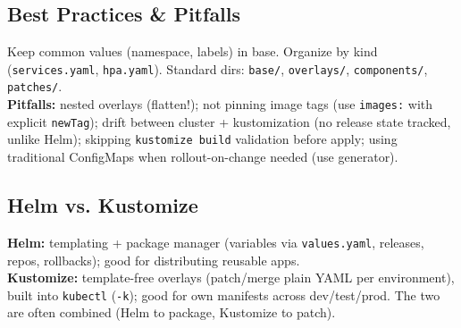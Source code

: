 \subsection{Best Practices \& Pitfalls}
Keep common values (namespace, labels) in base. Organize by kind (\texttt{services.yaml}, \texttt{hpa.yaml}). Standard dirs: \texttt{base/}, \texttt{overlays/}, \texttt{components/}, \texttt{patches/}.\\
\textbf{Pitfalls:} nested overlays (flatten!); not pinning image tags (use \texttt{images:} with explicit \texttt{newTag}); drift between cluster + kustomization (no release state tracked, unlike Helm); skipping \texttt{kustomize build} validation before apply; using traditional ConfigMaps when rollout-on-change needed (use generator).

\subsection{Helm vs. Kustomize}
\textbf{Helm:} templating + package manager (variables via \texttt{values.yaml}, releases, repos, rollbacks); good for distributing reusable apps. \\
\textbf{Kustomize:} template-free overlays (patch/merge plain YAML per environment), built into \texttt{kubectl} (\texttt{-k}); good for own manifests across dev/test/prod. The two are often combined (Helm to package, Kustomize to patch).
